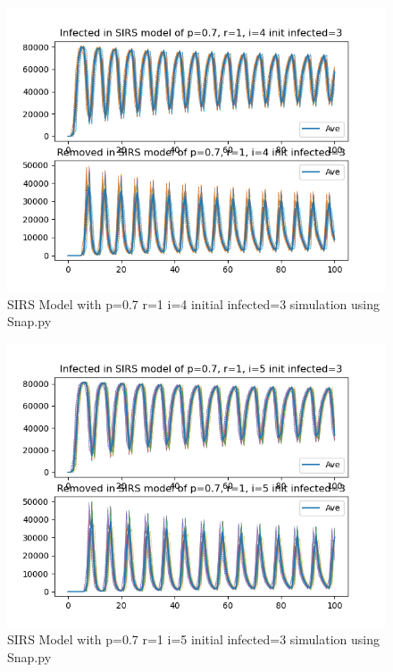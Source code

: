 \documentclass{subfile}
\begin{document}
  \begin{figure}
  \includegraphics[scale=0.8]{sirsp07r1i4s3}
  \caption[SIRS p=0.7,r=1,i=4,init infected=3]{SIRS Model with p=0.7 r=1 i=4 initial infected=3 simulation using Snap.py}
  \end{figure}
  \begin{figure}
  \includegraphics[scale=0.8]{sirsp07r1i5s3}
  \caption[SIRS p=0.7,r=1,i=5,init infected=3]{SIRS Model with p=0.7 r=1 i=5 initial infected=3 simulation using Snap.py}
  \end{figure}
\end{document}
